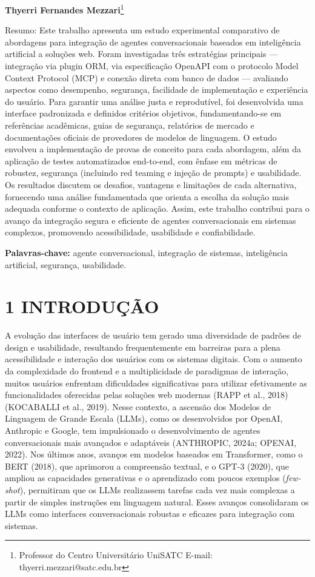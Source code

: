 \documentclass[
]{article}
\begin{document}
\textbf{Thyerri Fernandes Mezzari}\footnote{Professor do Centro
  Universitário UniSATC E-mail: thyerri.mezzari@satc.edu.br}

Resumo: Este trabalho apresenta um estudo experimental comparativo de
abordagens para integração de agentes conversacionais baseados em
inteligência artificial a soluções web. Foram investigadas três
estratégias principais --- integração via plugin ORM, via especificação
OpenAPI com o protocolo Model Context Protocol (MCP) e conexão direta
com banco de dados --- avaliando aspectos como desempenho, segurança,
facilidade de implementação e experiência do usuário. Para garantir uma
análise justa e reprodutível, foi desenvolvida uma interface padronizada
e definidos critérios objetivos, fundamentando-se em referências
acadêmicas, guias de segurança, relatórios de mercado e documentações
oficiais de provedores de modelos de linguagem. O estudo envolveu a
implementação de provas de conceito para cada abordagem, além da
aplicação de testes automatizados end-to-end, com ênfase em métricas de
robustez, segurança (incluindo red teaming e injeção de prompts) e
usabilidade. Os resultados discutem os desafios, vantagens e limitações
de cada alternativa, fornecendo uma análise fundamentada que orienta a
escolha da solução mais adequada conforme o contexto de aplicação.
Assim, este trabalho contribui para o avanço da integração segura e
eficiente de agentes conversacionais em sistemas complexos, promovendo
acessibilidade, usabilidade e confiabilidade.

\textbf{Palavras-chave:} agente conversacional, integração de sistemas,
inteligência artificial, segurança, usabilidade.

\section{1 INTRODUÇÃO}\label{introduuxe7uxe3o}

A evolução das interfaces de usuário tem gerado uma diversidade de
padrões de design e usabilidade, resultando frequentemente em barreiras
para a plena acessibilidade e interação dos usuários com os sistemas
digitais. Com o aumento da complexidade do frontend e a multiplicidade
de paradigmas de interação, muitos usuários enfrentam dificuldades
significativas para utilizar efetivamente as funcionalidades oferecidas
pelas soluções web modernas (RAPP et al., 2018) (KOCABALLI et al.,
2019). Nesse contexto, a ascensão dos Modelos de Linguagem de Grande
Escala (LLMs), como os desenvolvidos por OpenAI, Anthropic e Google, tem
impulsionado o desenvolvimento de agentes conversacionais mais avançados
e adaptáveis (ANTHROPIC, 2024a; OPENAI, 2022). Nos últimos anos, avanços
em modelos baseados em Transformer, como o BERT (2018), que aprimorou a
compreensão textual, e o GPT-3 (2020), que ampliou as capacidades
generativas e o aprendizado com poucos exemplos (\emph{few-shot}),
permitiram que os LLMs realizassem tarefas cada vez mais complexas a
partir de simples instruções em linguagem natural. Esses avanços
consolidaram os LLMs como interfaces conversacionais robustas e eficazes
para integração com sistemas.
\end{document}
